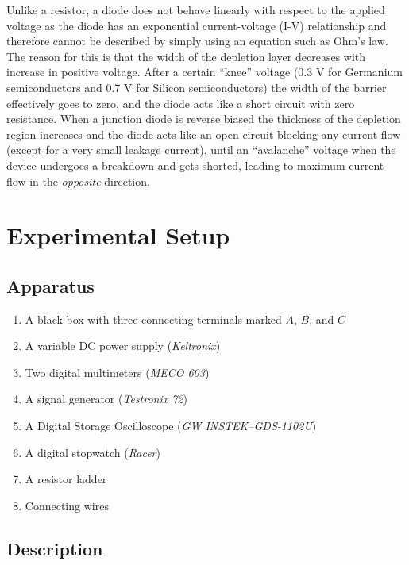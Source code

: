\begin{description}
Unlike a resistor, a diode does not behave linearly with respect to the applied voltage as the diode has an exponential current-voltage (I-V) relationship and therefore cannot be described by simply using an equation such as Ohm’s law. The reason for this is that the width of the depletion layer decreases with increase in positive voltage. After a certain ``knee'' voltage (0.3 V for Germanium semiconductors and 0.7 V for Silicon semiconductors) the width of the barrier effectively goes to zero, and the diode acts like a short circuit with zero resistance. When a junction diode is reverse biased the thickness of the depletion region increases and the diode acts like an open circuit blocking any current flow (except for a very small leakage current), until an ``avalanche'' voltage when the device undergoes a breakdown and gets shorted, leading to maximum current flow in the \textit{opposite} direction.


\end{description}




\section*{Experimental Setup}

\subsection*{Apparatus}

\begin{enumerate}
\item A black box with three connecting terminals marked $A$, $B$, and $C$
\item A variable DC power supply (\textit{Keltronix})
\item Two digital multimeters (\textit{MECO 603})
\item A signal generator (\textit{Testronix 72})
\item A Digital Storage Oscilloscope (\textit{GW INSTEK–GDS-1102U})
\item A digital stopwatch (\textit{Racer})
\item A resistor ladder
\item Connecting wires

\end{enumerate}

\subsection*{Description}

